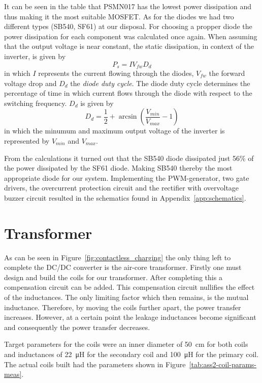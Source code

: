 \documentclass[11pt,titlepage]{report}
\begin{document}
It can be seen in the table that PSMN017 has the lowest power dissipation and thus making it the most suitable MOSFET. As for the diodes we had two different types (SB540, SF61) at our disposal. For choosing a propper diode the power dissipation for each component was calculated once again. When assuming that the output voltage is near constant, the static dissipation, in context of the inverter, is given by
\begin{equation}
	P_s = I V_{fw} D_{d}
\end{equation}
in which $I$ represents the current flowing through the diodes, $V_{fw}$ the forward voltage drop and $D_{d}$ the \textit{diode duty cycle}. The diode duty cycle determines the percentage of time in which current flows through the diode with respect to the switching frequency. $D_{d}$ is given by
\begin{equation}
	D_d = \frac{1}{2}+\arcsin{ \left( \frac{V_{min}}{V_{max}}-1 \right) }
\end{equation}
in which the minumum and maximum output voltage of the inverter is represented by $V_{min}$ and $V_{max}$.

From the calculations it turned out that the SB540 diode dissipated just 56\% of the power dissipated by the SF61 diode. Making SB540 thereby the most appropriate diode for our system. Implementing the PWM-generator, two gate drivers, the overcurrent protection circuit and the rectifier
with overvoltage buzzer circuit resulted in the schematics found in Appendix~\ref{app:schematics}.

\section{Transformer}
As can be seen in Figure~\ref{fig:contactless_charging} the only thing left to complete the DC/DC converter is the air-core transformer. Firstly one must design and build the coils for our transformer. After completing this a compensation circuit can be added. This compensation circuit nullifies the effect of the inductances. The only limiting factor which then remains, is the mutual inductance. Therefore, by moving the coils further apart, the power transfer increases. However, at a certain point the leakage inductances become significant and consequently the power transfer decreases.

Target parameters for the coils were an inner diameter of \SI{50}{cm} for both coils and inductances of \SI{22}{μH} for the secondary coil and \SI{100}{μH} for the primary coil. The actual coils built had the parameters shown in Figure~\ref{tab:ass2-coil-params-meas}.
\end{document}
